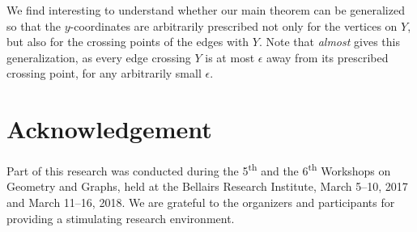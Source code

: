 \documentclass[a4paper, 11pt]{llncs}
\begin{document}
We find interesting to understand whether our main theorem can be generalized so that the $y$-coordinates are arbitrarily prescribed not only for the vertices on $Y$, but also for the crossing points of the edges with $Y$. Note that  {\em almost} gives this generalization, as every edge crossing $Y$ is at most $\epsilon$ away from its prescribed crossing point, for any arbitrarily small $\epsilon$. 

\section*{Acknowledgement}

Part of this research was conducted during the 5\textsuperscript{th} and the 6\textsuperscript{th} Workshops on Geometry and Graphs, held at the Bellairs Research Institute, March 5--10, 2017 and March 11--16, 2018.  We are grateful to the organizers and participants for providing a stimulating research environment.
%

\newpage


\end{document}
